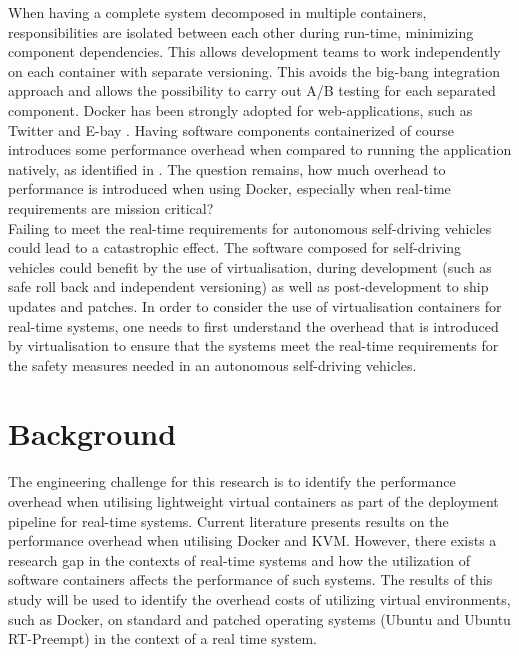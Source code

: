 When having a complete system decomposed in multiple containers, responsibilities are isolated between each other during run-time, minimizing component dependencies. This allows development teams to work independently on each container with separate versioning. This avoids the big-bang integration approach and allows the possibility to carry out A/B testing for each separated component. Docker has been strongly adopted for web-applications, such as Twitter and E-bay \cite{7034713}. Having software components containerized of course introduces some performance overhead when compared to running the application natively, as identified in \cite{7034713}. The question remains, how much overhead to performance is introduced when using Docker, especially when real-time requirements are mission critical?\\

Failing to meet the real-time requirements for autonomous self-driving vehicles could lead to a catastrophic effect. The software composed for self-driving vehicles could benefit by the use of virtualisation, during development (such as safe roll back and independent versioning) as well as post-development to ship updates and patches. In order to consider the use of virtualisation containers for real-time systems, one needs to first understand the overhead that is introduced by virtualisation to ensure that the systems meet the real-time requirements for the safety measures needed in an autonomous self-driving vehicles.\\

\section{Background}

The engineering challenge for this research is to identify the performance overhead when utilising lightweight virtual containers as part of the deployment pipeline for real-time systems. Current literature \cite{vmvscontainers} presents results on the performance overhead when utilising Docker and KVM. However, there exists a research gap in the contexts of real-time systems and how the utilization of software containers affects the performance of such systems. The results of this study will be used to identify the overhead costs of utilizing virtual environments, such as Docker, on standard and patched operating systems (Ubuntu and Ubuntu RT-Preempt) in the context of a real time system.\\

